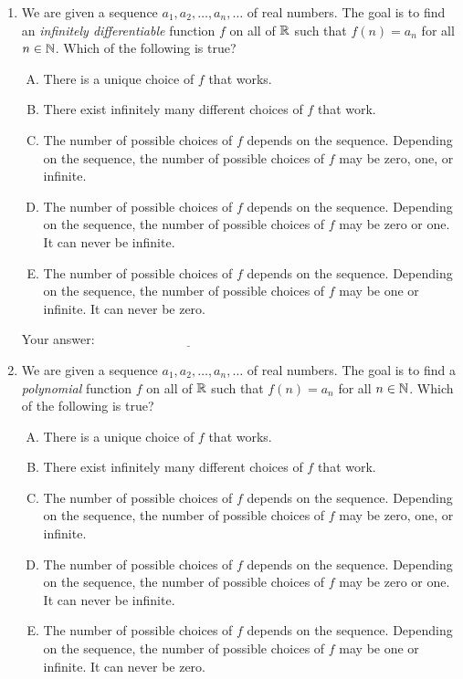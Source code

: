 \documentclass[10pt]{amsart}
\begin{document}
\begin{enumerate}
\item We are given a sequence $a_1, a_2, \dots, a_n, \dots$ of real
  numbers. The goal is to find an {\em infinitely differentiable}
  function $f$ on all of $\mathbb{R}$ such that $f(n) = a_n$ for all $n \in
  \mathbb{N}$. Which of the following is true?

  \begin{enumerate}[(A)]
  \item There is a unique choice of $f$ that works.
  \item There exist infinitely many different choices of $f$ that work.
  \item The number of possible choices of $f$ depends on the
    sequence. Depending on the sequence, the number of possible
    choices of $f$ may be zero, one, or infinite.
  \item The number of possible choices of $f$ depends on the
    sequence. Depending on the sequence, the number of possible
    choices of $f$ may be zero or one. It can never be infinite.
  \item The number of possible choices of $f$ depends on the
    sequence. Depending on the sequence, the number of possible
    choices of $f$ may be one or infinite. It can never be zero.
  \end{enumerate}

  \vspace{0.1in}
  Your answer: $\underline{\qquad\qquad\qquad\qquad\qquad\qquad\qquad}$
  \vspace{0.15in}
\item We are given a sequence $a_1, a_2, \dots, a_n, \dots$ of real
  numbers. The goal is to find a {\em polynomial}
  function $f$ on all of $\mathbb{R}$ such that $f(n) = a_n$ for all $n \in
  \mathbb{N}$. Which of the following is true?

  \begin{enumerate}[(A)]
  \item There is a unique choice of $f$ that works.
  \item There exist infinitely many different choices of $f$ that work.
  \item The number of possible choices of $f$ depends on the
    sequence. Depending on the sequence, the number of possible
    choices of $f$ may be zero, one, or infinite.
  \item The number of possible choices of $f$ depends on the
    sequence. Depending on the sequence, the number of possible
    choices of $f$ may be zero or one. It can never be infinite.
  \item The number of possible choices of $f$ depends on the
    sequence. Depending on the sequence, the number of possible
    choices of $f$ may be one or infinite. It can never be zero.
  \end{enumerate}


\end{enumerate}
\end{document}
